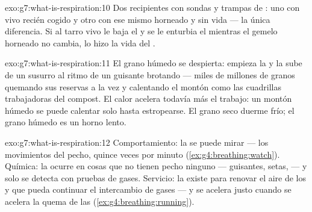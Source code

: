 \begin{solution}{exo:g7:what-is-respiration:10}
Dos recipientes con sondas y trampas de : uno con  vivo
recién cogido y otro con ese mismo  horneado y sin vida --- la
única diferencia. Si al tarro vivo le baja el  y se le enturbia
el  mientras el gemelo horneado no cambia, lo hizo la vida
del .
\end{solution}

\begin{solution}{exo:g7:what-is-respiration:11}
El grano húmedo se despierta: empieza la  y la 
sube de un susurro al ritmo de un guisante brotando --- miles de
millones de granos quemando sus reservas a la vez y calentando el montón
como las cuadrillas trabajadoras del compost. El calor acelera todavía
más el trabajo: un montón húmedo se puede calentar solo hasta
estropearse. El grano seco duerme frío; el grano húmedo es un horno lento.
\end{solution}

\begin{solution}{exo:g7:what-is-respiration:12}
Comportamiento: la  se puede mirar --- los movimientos del
pecho, quince veces por minuto (\cref{ex:g4:breathing:watch}). Química:
la  ocurre en cosas que no tienen pecho ninguno ---
guisantes, setas,  --- y solo se detecta con pruebas de gases.
Servicio: la  existe para renovar el aire de los  y
que pueda continuar el intercambio de gases --- y se acelera justo
cuando se acelera la quema de las 
(\cref{ex:g4:breathing:running}).
\end{solution}

